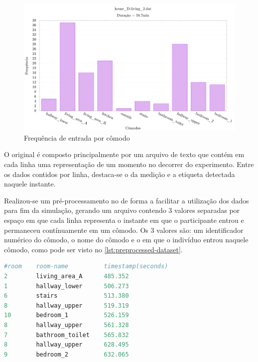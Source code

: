 \begin{figure}[htb]
	
	\begin{center}
		
		\caption{\label{fig:dataset-histogram}Frequência de entrada por cômodo}
		\includegraphics[width=0.95\linewidth]{img/dataset-histogram}
		\fonte{\autoriapropria}
		
	\end{center}

\end{figure}

O \dataset original é composto principalmente por um arquivo de texto que contém em cada linha uma representação de um momento no decorrer do experimento. Entre os dados contidos por linha, destaca-se o \timestamp da medição e a etiqueta detectada naquele instante. 

Realizou-se um pré-processamento no \dataset de forma a facilitar a utilização dos dados para fim da simulação, gerando um arquivo contendo 3 valores separadas por espaço em que cada linha representa o instante em que o participante entrou e permaneceu contínuamente em um cômodo. Os 3 valores são: um identificador numérico do cômodo, o nome do cômodo e o \timestamp em que o indivíduo entrou naquele cômodo, como pode ser visto no \autoref{lst:preprocessed-dataset}.
\begin{lstlisting}[float=htb, language=python, caption={Parte do \dataset pré-processado}, label=lst:preprocessed-dataset]
#room    room-name          timestamp(seconds)
2        living_area_A      485.352
1        hallway_lower      506.273
6        stairs             513.380
8        hallway_upper      519.319
10       bedroom_1          526.159
8        hallway_upper      561.328
7        bathroom_toilet    565.832
8        hallway_upper      628.495
9        bedroom_2          632.065
\end{lstlisting}
	
